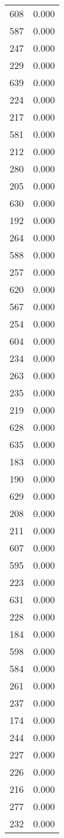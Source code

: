 \begin{table}
\begin{tabular}{lr}
608 & 0.000 \\
587 & 0.000 \\
247 & 0.000 \\
229 & 0.000 \\
639 & 0.000 \\
224 & 0.000 \\
217 & 0.000 \\
581 & 0.000 \\
212 & 0.000 \\
280 & 0.000 \\
205 & 0.000 \\
630 & 0.000 \\
192 & 0.000 \\
264 & 0.000 \\
588 & 0.000 \\
257 & 0.000 \\
620 & 0.000 \\
567 & 0.000 \\
254 & 0.000 \\
604 & 0.000 \\
234 & 0.000 \\
263 & 0.000 \\
235 & 0.000 \\
219 & 0.000 \\
628 & 0.000 \\
635 & 0.000 \\
183 & 0.000 \\
190 & 0.000 \\
629 & 0.000 \\
208 & 0.000 \\
211 & 0.000 \\
607 & 0.000 \\
595 & 0.000 \\
223 & 0.000 \\
631 & 0.000 \\
228 & 0.000 \\
184 & 0.000 \\
598 & 0.000 \\
584 & 0.000 \\
261 & 0.000 \\
237 & 0.000 \\
174 & 0.000 \\
244 & 0.000 \\
227 & 0.000 \\
226 & 0.000 \\
216 & 0.000 \\
277 & 0.000 \\
232 & 0.000 \\

\end{tabular}
\end{table}
